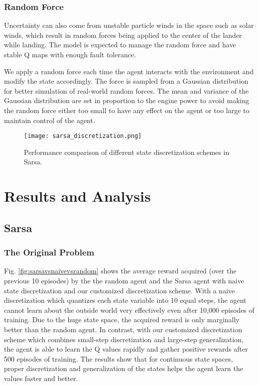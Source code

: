 \documentclass[10pt, conference]{IEEEtran}
\begin{document}
\subsubsection{Random Force}
 Uncertainty can also come from unstable particle winds in the space such as solar winds, which result in random forces being applied to the center of the lander while landing. The model is expected to manage the random force and have stable Q maps with enough fault tolerance. 
 
 We apply a random force each time the agent interacts with the environment and modify the state accordingly. The force is sampled from a Gaussian distribution for better simulation of real-world random forces. The mean and variance of the Gaussian distribution are set in proportion to the engine power to avoid making the random force either too small to have any effect on the agent or too large to maintain control of the agent. 
 
 \begin{figure}[!t]
    \centering
    \texttt{[image: sarsa\_discretization.png]}
    \caption{Performance comparison of different state discretization schemes in Sarsa.}
    \label{fig:sarsa_discretization}
\end{figure}

\section{Results and Analysis}
\subsection{Sarsa}
\subsubsection{The Original Problem}
Fig. \ref{fig:sarsavsnaivevsrandom} shows the average reward acquired (over the previous 10 episodes) by the the random agent and the Sarsa agent with naive state discretization and our customized discretization scheme. With a naive discretization which quantizes each state variable into 10 equal steps, the agent cannot learn about the outside world very effectively even after 10,000 episodes of training. Due to the huge state space, the acquired reward is only marginally better than the random agent. In contrast, with our customized discretization scheme which combines small-step discretization and large-step generalization, the agent is able to learn the Q values rapidly and gather positive rewards after 500 episodes of training. The results show that for continuous state spaces, proper discretization and generalization of the states helps the agent learn the values faster and better.
\end{document}
